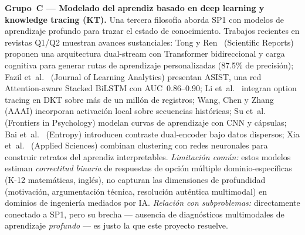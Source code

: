 \textbf{Grupo~C — Modelado del aprendiz basado en deep learning y knowledge tracing (KT).}
Una tercera filosofía aborda SP1 con modelos de aprendizaje profundo para trazar el estado de conocimiento. Trabajos recientes en revistas Q1/Q2 muestran avances sustanciales: Tong y Ren~\cite{tong2025deepkt} (Scientific Reports) proponen una arquitectura dual-stream con Transformer bidireccional y carga cognitiva para generar rutas de aprendizaje personalizadas (87.5\% de precisión); Fazil et~al.~\cite{fazil2024asist} (Journal of Learning Analytics) presentan ASIST, una red Attention-aware Stacked BiLSTM con AUC~0.86--0.90; Li et~al.~\cite{li2025option} integran option tracing en DKT sobre más de un millón de registros; Wang, Chen y Zhang~\cite{wang2023daktn} (AAAI) incorporan activación local sobre secuencias históricas; Su et~al.~\cite{su2023deepkt} (Frontiers in Psychology) modelan curvas de aprendizaje con CNN y cápsulas; Bai et~al.~\cite{bai2025deckt} (Entropy) introducen contraste dual-encoder bajo datos dispersos; Xia et~al.~\cite{xia2023ktcluster} (Applied Sciences) combinan clustering con redes neuronales para construir retratos del aprendiz interpretables. \emph{Limitación común:} estos modelos estiman \emph{correctitud binaria} de respuestas de opción múltiple dominio-específicas (K-12 matemáticas, inglés), no capturan las dimensiones de profundidad (motivación, argumentación técnica, resolución auténtica multimodal) en dominios de ingeniería mediados por IA. \emph{Relación con subproblemas:} directamente conectado a SP1, pero su brecha — ausencia de diagnósticos multimodales de aprendizaje \emph{profundo} — es justo la que este proyecto resuelve.


